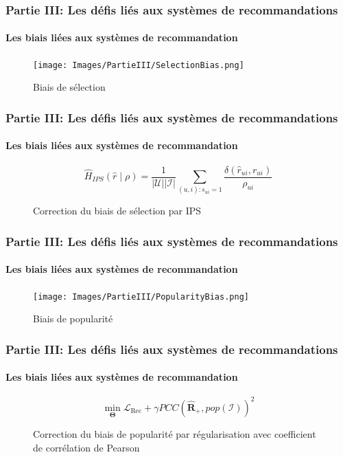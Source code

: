 \begin{frame}

    \frametitle{Partie III: Les défis liés aux systèmes de recommandations}
    \framesubtitle{Les biais liées aux systèmes de recommandation}

    \begin{figure}
        \centering
        \texttt{[image: Images/PartieIII/SelectionBias.png]}
        \caption{Biais de sélection}
    \end{figure}

\end{frame}

\begin{frame}

    \frametitle{Partie III: Les défis liés aux systèmes de recommandations}
    \framesubtitle{Les biais liées aux systèmes de recommandation}

    \begin{figure}
        \begin{equation*}
            \hat{H}_{I P S}(\hat{r} \mid \rho)=\frac{1}{|\mathcal{U}||\mathcal{I}|} \sum_{(u, i): s_{u i}=1} \frac{\delta\left(\hat{r}_{u i}, r_{u i}\right)}{\rho_{u i}}
        \end{equation*}
        \caption{Correction du biais de sélection par IPS}
    \end{figure}

\end{frame}

\begin{frame}

    \frametitle{Partie III: Les défis liés aux systèmes de recommandations}
    \framesubtitle{Les biais liées aux systèmes de recommandation}

    \begin{figure}
        \centering
        \texttt{[image: Images/PartieIII/PopularityBias.png]}
        \caption{Biais de popularité}
    \end{figure}

\end{frame}

\begin{frame}

    \frametitle{Partie III: Les défis liés aux systèmes de recommandations}
    \framesubtitle{Les biais liées aux systèmes de recommandation}

    \begin{figure}
        \begin{equation*}
            \min _{\boldsymbol{\Theta}} \mathcal{L}_{\operatorname{Rec}}+\gamma P C C\left(\widehat{\mathbf{R}}_{+}, p o p(\mathcal{I})\right)^2
        \end{equation*}
        \caption{Correction du biais de popularité par régularisation avec coefficient de corrélation de Pearson}
    \end{figure}

\end{frame}

